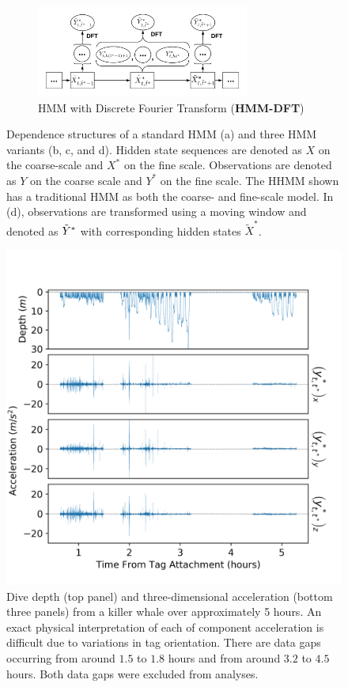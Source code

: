 \begin{figure}[ht]
    \newline
    \begin{subfigure}{\textwidth}
      \centering
      \includegraphics[width=2.75in]{../Plots/HMM-DFT.png}  
      \caption{HMM with Discrete Fourier Transform (\textbf{HMM-DFT})}
      \label{fig:HMM-DFT}
    \end{subfigure}
    \caption{Dependence structures of a standard HMM (a) and three HMM variants (b, c, and d). Hidden state sequences are denoted as $X$ on the coarse-scale and $X^*$ on the fine scale. Observations are denoted as $Y$ on the coarse scale and $Y^*$ on the fine scale. The HHMM shown has a traditional HMM as both the coarse- and fine-scale model. In (d), observations are transformed using a moving window and denoted as $\tilde{Y}^*$ with corresponding hidden states $\tilde X^*$.}
    \label{fig:models}
\end{figure}


\begin{figure}[ht]
	\centering
	\includegraphics[width=5.25in]{../Plots/raw_data.png}
	\caption{Dive depth (top panel) and three-dimensional acceleration (bottom three panels) from a killer whale over approximately 5 hours. An exact physical interpretation of each of component acceleration is difficult due to variations in tag orientation. There are data gaps occurring from around $1.5$ to $1.8$ hours and from around $3.2$ to $4.5$ hours. Both data gaps were excluded from analyses.}
	\label{fig:data}
\end{figure}

